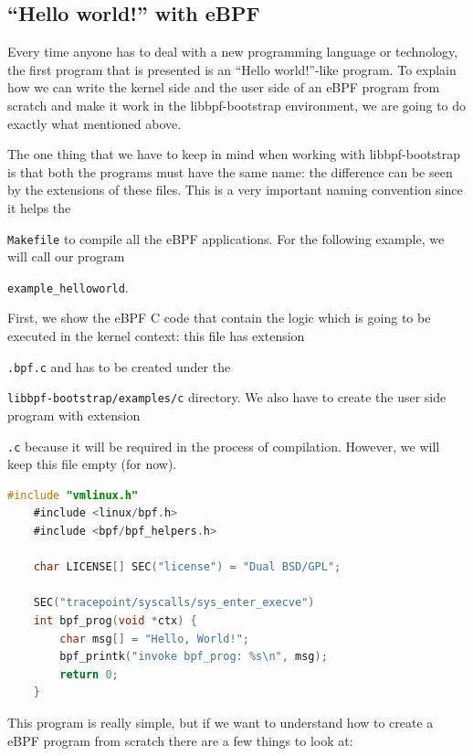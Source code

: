 \subsection{``Hello world!'' with eBPF}

Every time anyone has to deal with a new programming language or technology, the first program that is presented is an ``Hello world!''-like program.
To explain how we can write the kernel side and the user side of an eBPF program from scratch and make it work in the libbpf-bootstrap environment, we are going to do exactly what mentioned above.

The one thing that we have to keep in mind when working with libbpf-bootstrap is that both the programs must have the same name: the difference can be seen by the extensions of these files.
This is a very important naming convention since it helps the \raggedright\colorbox{backcolour}{\lstinline[style=commandline, language=bash]|Makefile|} to compile all the eBPF applications.
For the following example, we will call our program \raggedright\colorbox{backcolour}{\lstinline[style=commandline, language=bash]|example_helloworld|}.

First, we show the eBPF C code that contain the logic which is going to be executed in the kernel context: this file has extension \raggedright\colorbox{backcolour}{\lstinline[style=commandline, language=bash]|.bpf.c|} and has to be created under the \raggedright\colorbox{backcolour}{\lstinline[style=commandline, language=bash]|libbpf-bootstrap/examples/c|} directory.
We also have to create the user side program with extension \raggedright\colorbox{backcolour}{\lstinline[style=commandline, language=bash]|.c|} because it will be required in the process of compilation.
However, we will keep this file empty (for now).

\begin{lstlisting}[style=cstyle, language=C, caption={Code of the ``Hello world!''-like kernel side program in libbpf-bootstrap.}, title=example\_helloworld.bpf.c]
	#include "vmlinux.h"
	#include <linux/bpf.h>
	#include <bpf/bpf_helpers.h>
	
	char LICENSE[] SEC("license") = "Dual BSD/GPL";
	
	SEC("tracepoint/syscalls/sys_enter_execve")
	int bpf_prog(void *ctx) {
		char msg[] = "Hello, World!";
		bpf_printk("invoke bpf_prog: %s\n", msg);
		return 0;
	}
\end{lstlisting}

This program is really simple, but if we want to understand how to create a eBPF program from scratch there are a few things to look at:

